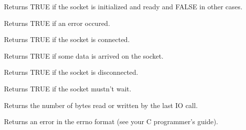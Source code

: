 \label{wxsocketbaseok}


Returns TRUE if the socket is initialized and ready and FALSE in other
cases.

\label{wxsocketbaseerror}


Returns TRUE if an error occured.

\label{wxsocketbaseconnected}


Returns TRUE if the socket is connected.

\label{wxsocketbaseisdata}


Returns TRUE if some data is arrived on the socket. 

\label{wxsocketbasedisconnected}


Returns TRUE if the socket is disconnected.

\label{wxsocketbasenowait}


Returns TRUE if the socket mustn't wait.

\label{wxsocketbaselastcount}


Returns the number of bytes read or written by the last IO call.

\label{wxsocketbaselasterror}


Returns an error in the errno format (see your C programmer's guide).

%
%
\label{wxsocketbasepeek}


